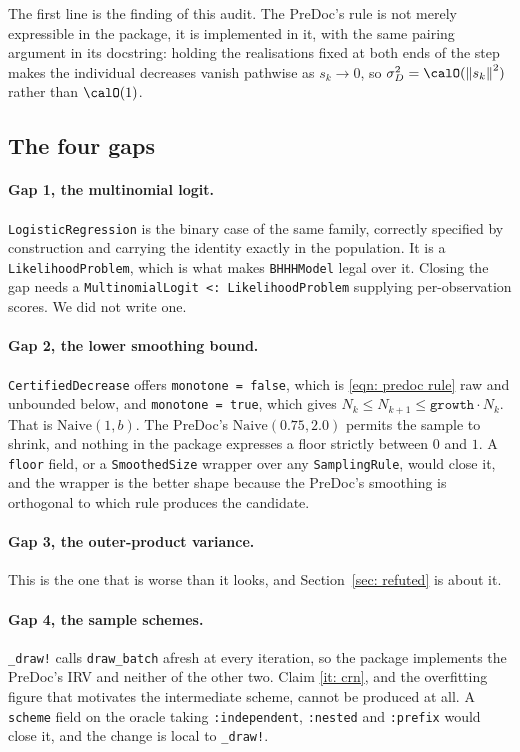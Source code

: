 \documentclass[11pt,a4paper]{article}
\providecommand{\norm}[1]{\left \lVert #1 \right \rVert}
\begin{document}
The first line is the finding of this audit. The PreDoc's rule is not merely
expressible in the package, it is implemented in it, with the same pairing
argument in its docstring: holding the realisations fixed at both ends of the
step makes the individual decreases vanish pathwise as $s_k \to 0$, so
$\sigma_D^2 = \calO(\norm{s_k}^2)$ rather than $\calO(1)$.

\subsection{The four gaps}

\paragraph{Gap 1, the multinomial logit.}
\texttt{LogisticRegression} is the binary case of the same family, correctly
specified by construction and carrying the identity exactly in the population. It
is a \texttt{LikelihoodProblem}, which is what makes \texttt{BHHHModel} legal
over it. Closing the gap needs a \texttt{MultinomialLogit <: LikelihoodProblem}
supplying per-observation scores. We did not write one.

\paragraph{Gap 2, the lower smoothing bound.}
\texttt{CertifiedDecrease} offers \texttt{monotone = false}, which is
\eqref{eqn: predoc rule} raw and unbounded below, and \texttt{monotone = true},
which gives $N_k \leq N_{k+1} \leq \texttt{growth}\cdot N_k$. That is
$\text{Naive}(1, b)$. The PreDoc's $\text{Naive}(0.75, 2.0)$ permits the sample to
shrink, and nothing in the package expresses a floor strictly between $0$ and
$1$. A \texttt{floor} field, or a \texttt{SmoothedSize} wrapper over any
\texttt{SamplingRule}, would close it, and the wrapper is the better shape
because the PreDoc's smoothing is orthogonal to which rule produces the
candidate.

\paragraph{Gap 3, the outer-product variance.}
This is the one that is worse than it looks, and Section~\ref{sec: refuted} is
about it.

\paragraph{Gap 4, the sample schemes.}
\texttt{\_draw!} calls \texttt{draw\_batch} afresh at every iteration, so the
package implements the PreDoc's IRV and neither of the other two. Claim
\ref{it: crn}, and the overfitting figure that motivates the intermediate scheme,
cannot be produced at all. A \texttt{scheme} field on the oracle taking
\texttt{:independent}, \texttt{:nested} and \texttt{:prefix} would close it, and
the change is local to \texttt{\_draw!}.
\end{document}
